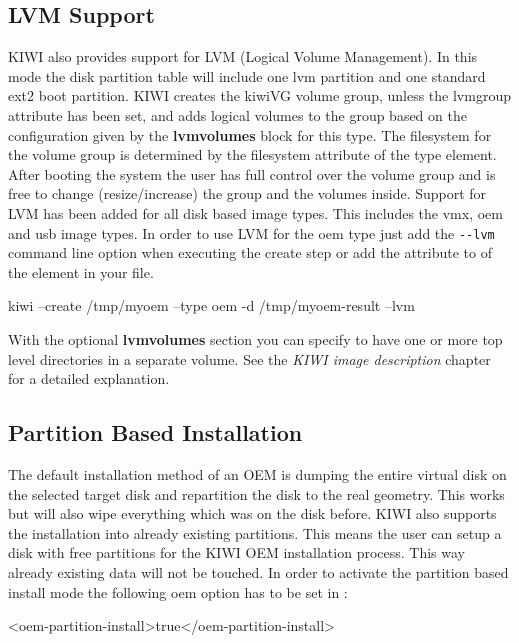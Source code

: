 \subsection{LVM Support}

KIWI also provides support for LVM (Logical Volume Management). In this
mode the disk partition table will include one lvm partition and one
standard ext2 boot partition. KIWI creates the kiwiVG volume group, unless
the lvmgroup attribute has been set, and adds logical volumes to the group
based on the configuration given by the \textbf{lvmvolumes} block
for this type. The filesystem for the volume group is determined by the
filesystem attribute of the type element. After booting the system the user
has full control over the volume group and is free to change
(resize/increase) the group and the volumes inside. Support for LVM has
been added for all disk based image types. This includes the vmx, oem and
usb image types. In order to use LVM for the oem type just add the 
\verb+--lvm+ command line option when executing the create step or add
the attribute  to of the  
element in your  file.

\begin{Command}{12cm}
kiwi --create /tmp/myoem --type oem -d /tmp/myoem-result --lvm
\end{Command}

With the optional \textbf{lvmvolumes} section you can specify to have 
one or more top level directories in a separate volume. See the
\textit{KIWI image description} chapter for a detailed explanation.

\subsection{Partition Based Installation}

The default installation method of an OEM is dumping the entire
virtual disk on the selected target disk and repartition the disk
to the real geometry. This works but will also wipe everything which
was on the disk before. KIWI also supports the installation into
already existing partitions. This means the user can setup a disk
with free partitions for the KIWI OEM installation process. This
way already existing data will not be touched. In order to activate
the partition based install mode the following oem option has to
be set in :

\begin{xml}
<oem-partition-install>true</oem-partition-install>
\end{xml}

